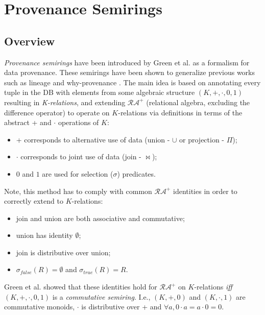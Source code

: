 \section{Provenance Semirings}\label{sec:semiring provenance}
\subsection{Overview}\footnotemark
{}
\textit{Provenance semirings} have been introduced by Green et al. \cite{green2007provenance} as a formalism for data provenance. These semirings have been shown \cite{Karvounarakis:2012:SDQ:2380776.2380778} to generalize previous works such as lineage \cite{Cui:2000:TLV:357775.357777} and why-provenance \cite{DBLP:conf/icdt/BunemanKT01}. The main idea is based on annotating every tuple in the DB with elements from some algebraic structure $(K,+,\cdot,0,1)$\footnotemark
{}
resulting in \textit{K-relations}\footnotemark, 
and extending $\mathcal{RA^+}$ (relational algebra, excluding the difference operator) to operate on $K$-relations via definitions in terms of the abstract + and $\cdot$ operations of $K$:
\begin{itemize}
    \item + corresponds to alternative use of data (union - $\cup$ or projection - $\Pi$);
    \item $\cdot$ corresponds to joint use of data (join - $\bowtie$);
    \item $0$ and $1$ are used for selection ($\sigma$) predicates.
\end{itemize}
Note, this method has to comply with common $\mathcal{RA^+}$ identities in order to correctly extend to $K$-relations:
\begin{itemize}
    \item join and union are both associative and commutative;
    \item union has identity $\emptyset$;
    \item join is distributive over union;
    \item $\sigma_{false}(R) = \emptyset$ and $\sigma_{true}(R) = R$.
\end{itemize}
Green et al. \cite{green2007provenance} showed that these identities hold for $\mathcal{RA^+}$ on $K$-relations \textit{iff} $(K,+,\cdot,0,1)$ is a \textit{commutative semiring}.
I.e., $(K,+,0)$ and $(K,\cdot,1)$ are commutative monoids\footnotemark,
$\cdot$ is distributive over + and $\forall a, 0 \cdot a = a \cdot 0 = 0$. \\

